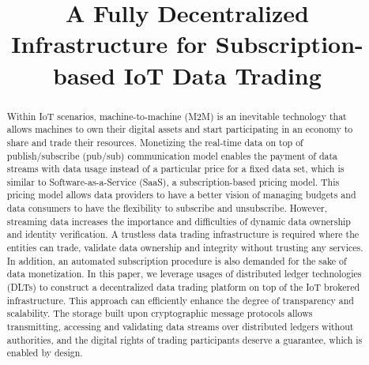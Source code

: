 \documentclass[conference]{IEEEtran}
\begin{document}
\title{A Fully Decentralized Infrastructure for Subscription-based IoT Data Trading}

\author{
\and
{}
\and
{}
}

\maketitle

\begin{abstract} 
Within IoT scenarios, machine-to-machine (M2M) is an inevitable technology that allows machines to own their digital assets and start participating in an economy to share and trade their resources. Monetizing the real-time data on top of publish/subscribe (pub/sub) communication model enables the payment of data streams with data usage instead of a particular price for a fixed data set, which is similar to Software-as-a-Service (SaaS), a subscription-based pricing model. This pricing model allows data providers to have a better vision of managing budgets and data consumers to have the flexibility to subscribe and unsubscribe. However, streaming data increases the importance and difficulties of dynamic data ownership and identity verification. A trustless data trading infrastructure is required where the entities can trade, validate data ownership and integrity without trusting any services. In addition, an automated subscription procedure is also demanded for the sake of data monetization. In this paper, we leverage usages of distributed ledger technologies (DLTs) to construct a decentralized data trading platform on top of the IoT brokered infrastructure. This approach can efficiently enhance the degree of transparency and scalability. The storage built upon cryptographic message protocols allows transmitting, accessing and validating data streams over distributed ledgers without authorities, and the digital rights of trading participants deserve a guarantee, which is enabled by design.
\end{abstract}
\end{document}
